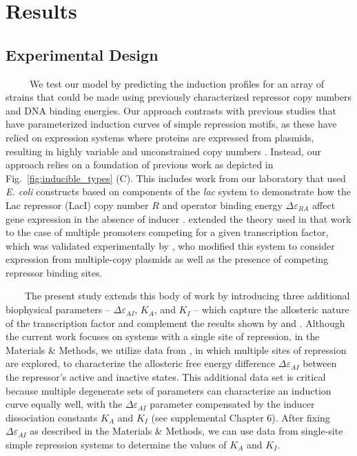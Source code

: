 \documentclass[12pt]{caltech_thesis}
\begin{document}
\hypertarget{results}{%
\section{Results}\label{results}}

\hypertarget{experimental-design}{%
\subsection{Experimental Design}\label{experimental-design}}

~~~~~We test our model by predicting the induction profiles for an array
of strains that could be made using previously characterized repressor
copy numbers and DNA binding energies. Our approach contrasts with
previous studies that have parameterized induction curves of simple
repression motifs, as these have relied on expression systems where
proteins are expressed from plasmids, resulting in highly variable and
unconstrained copy numbers
\autocite{murphy2007,daber2009a,daber2011,sochor2014}. Instead, our
approach relies on a foundation of previous work as depicted in
Fig.~\ref{fig:inducible_types} (C). This includes work from our
laboratory that used \emph{E. coli} constructs based on components of
the \emph{lac} system to demonstrate how the Lac repressor (LacI) copy
number \(R\) and operator binding energy \(\Delta\varepsilon_{RA}\)
affect gene expression in the absence of inducer \autocite{garcia2011}.
\textcite{rydenfelt2014b} extended the theory used in that work to the
case of multiple promoters competing for a given transcription factor,
which was validated experimentally by \textcite{brewster2014}, who
modified this system to consider expression from multiple-copy plasmids
as well as the presence of competing repressor binding sites.

~~~~The present study extends this body of work by introducing three
additional biophysical parameters -- \(\Delta\varepsilon_{AI}\),
\(K_A\), and \(K_I\) -- which capture the allosteric nature of the
transcription factor and complement the results shown by
\textcite{garcia2011} and \textcite{brewster2014}. Although the current
work focuses on systems with a single site of repression, in the
Materials \& Methods, we utilize data from \textcite{brewster2014}, in
which multiple sites of repression are explored, to characterize the
allosteric free energy difference \(\Delta\varepsilon_{AI}\) between the
repressor's active and inactive states. This additional data set is
critical because multiple degenerate sets of parameters can characterize
an induction curve equally well, with the \(\Delta\varepsilon_{AI}\)
parameter compensated by the inducer dissociation constants \(K_A\) and
\(K_I\) (see supplemental Chapter 6). After fixing
\(\Delta\varepsilon_{AI}\) as described in the Materials \& Methods, we
can use data from single-site simple repression systems to determine the
values of \(K_A\) and \(K_I\).
\end{document}
